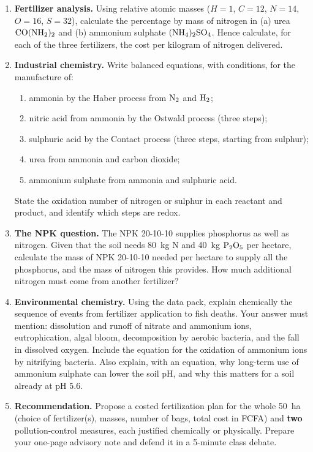 \documentclass[11pt]{article}
\newcommand{\cle}[1]{{\popxbold\color{popdark}#1}}
\begin{document}
\begin{enumerate}
\item \textbf{Fertilizer analysis.} Using relative atomic masses ($H = 1$, $C = 12$, $N = 14$, $O = 16$, $S = 32$), calculate the percentage by mass of nitrogen in (a) urea $\ce{CO(NH2)2}$ and (b) ammonium sulphate $\ce{(NH4)2SO4}$. Hence calculate, for each of the three fertilizers, the \cle{cost per kilogram of nitrogen} delivered.
\item \textbf{Industrial chemistry.} Write balanced equations, with conditions, for the manufacture of:
\begin{enumerate}
\item ammonia by the Haber process from $\ce{N2}$ and $\ce{H2}$;
\item nitric acid from ammonia by the Ostwald process (three steps);
\item sulphuric acid by the Contact process (three steps, starting from sulphur);
\item urea from ammonia and carbon dioxide;
\item ammonium sulphate from ammonia and sulphuric acid.
\end{enumerate}
State the oxidation number of nitrogen or sulphur in each reactant and product, and identify which steps are redox.
\item \textbf{The NPK question.} The NPK 20-10-10 supplies phosphorus as well as nitrogen. Given that the soil needs \SI{80}{kg} N and \SI{40}{kg} $\ce{P2O5}$ per hectare, calculate the mass of NPK 20-10-10 needed per hectare to supply all the phosphorus, and the mass of nitrogen this provides. How much additional nitrogen must come from another fertilizer?
\item \textbf{Environmental chemistry.} Using the data pack, explain chemically the sequence of events from fertilizer application to fish deaths. Your answer must mention: dissolution and runoff of nitrate and ammonium ions, \cle{eutrophication}, algal bloom, decomposition by aerobic bacteria, and the fall in dissolved oxygen. Include the equation for the oxidation of ammonium ions by nitrifying bacteria. Also explain, with an equation, why long-term use of ammonium sulphate can lower the soil pH, and why this matters for a soil already at pH 5.6.
\item \textbf{Recommendation.} Propose a costed fertilization plan for the whole \SI{50}{ha} (choice of fertilizer(s), masses, number of bags, total cost in FCFA) and \textbf{two} pollution-control measures, each justified chemically or physically. Prepare your one-page advisory note and defend it in a 5-minute class debate.
\end{enumerate}
\end{document}
